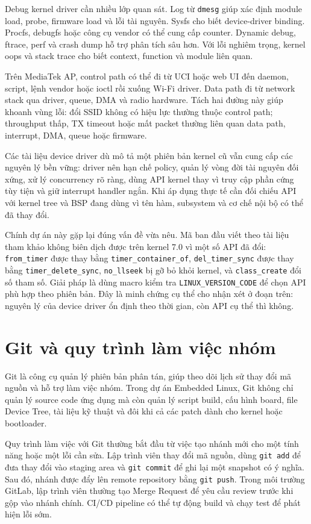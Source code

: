 \documentclass[11pt]{article}
\newcommand{\code}[1]{\texttt{#1}}
\begin{document}
Debug kernel driver cần nhiều lớp quan sát. Log từ \code{dmesg} giúp xác định module load, probe, firmware load và lỗi tài nguyên. Sysfs cho biết device-driver binding. Procfs, debugfs hoặc công cụ vendor có thể cung cấp counter. Dynamic debug, ftrace, perf và crash dump hỗ trợ phân tích sâu hơn. Với lỗi nghiêm trọng, kernel oops và stack trace cho biết context, function và module liên quan.

Trên MediaTek AP, control path có thể đi từ UCI hoặc web UI đến daemon, script, lệnh vendor hoặc ioctl rồi xuống Wi-Fi driver. Data path đi từ network stack qua driver, queue, DMA và radio hardware. Tách hai đường này giúp khoanh vùng lỗi: đổi SSID không có hiệu lực thường thuộc control path; throughput thấp, TX timeout hoặc mất packet thường liên quan data path, interrupt, DMA, queue hoặc firmware.

Các tài liệu device driver dù mô tả một phiên bản kernel cũ vẫn cung cấp các nguyên lý bền vững: driver nên hạn chế policy, quản lý vòng đời tài nguyên đối xứng, xử lý concurrency rõ ràng, dùng API kernel thay vì truy cập phần cứng tùy tiện và giữ interrupt handler ngắn. Khi áp dụng thực tế cần đối chiếu API với kernel tree và BSP đang dùng vì tên hàm, subsystem và cơ chế nội bộ có thể đã thay đổi.

Chính dự án này gặp lại đúng vấn đề vừa nêu. Mã ban đầu viết theo tài liệu tham khảo không biên dịch được trên kernel 7.0 vì một số API đã đổi: \code{from\_timer} được thay bằng \code{timer\_container\_of}, \code{del\_timer\_sync} được thay bằng \code{timer\_delete\_sync}, \code{no\_llseek} bị gỡ bỏ khỏi kernel, và \code{class\_create} đổi số tham số. Giải pháp là dùng macro kiểm tra \code{LINUX\_VERSION\_CODE} để chọn API phù hợp theo phiên bản. Đây là minh chứng cụ thể cho nhận xét ở đoạn trên: nguyên lý của device driver ổn định theo thời gian, còn API cụ thể thì không.

\section{Git và quy trình làm việc nhóm}

Git là công cụ quản lý phiên bản phân tán, giúp theo dõi lịch sử thay đổi mã nguồn và hỗ trợ làm việc nhóm. Trong dự án Embedded Linux, Git không chỉ quản lý source code ứng dụng mà còn quản lý script build, cấu hình board, file Device Tree, tài liệu kỹ thuật và đôi khi cả các patch dành cho kernel hoặc bootloader.

Quy trình làm việc với Git thường bắt đầu từ việc tạo nhánh mới cho một tính năng hoặc một lỗi cần sửa. Lập trình viên thay đổi mã nguồn, dùng \code{git add} để đưa thay đổi vào staging area và \code{git commit} để ghi lại một snapshot có ý nghĩa. Sau đó, nhánh được đẩy lên remote repository bằng \code{git push}. Trong môi trường GitLab, lập trình viên thường tạo Merge Request để yêu cầu review trước khi gộp vào nhánh chính. CI/CD pipeline có thể tự động build và chạy test để phát hiện lỗi sớm.
\end{document}
